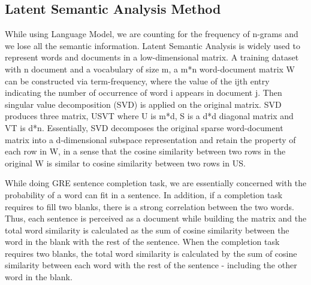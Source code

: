 \documentclass[11pt]{article}
\begin{document}
\subsection{Latent Semantic Analysis Method}
While using Language Model, we are counting for the frequency of n-grams and we lose all the semantic information. Latent Semantic Analysis is widely used to represent words and documents in a low-dimensional matrix. A training dataset with n document and a vocabulary of size m, a m*n word-document matrix W can be constructed via term-frequency, where the value of the ijth entry indicating the number of occurrence of word i appears in document j. Then singular value decomposition (SVD) is applied on the original matrix. SVD produces three matrix, USVT where U is m*d, S is a d*d diagonal matrix and VT is d*n. Essentially, SVD decomposes the original sparse word-document matrix into a d-dimensional subspace representation and retain the property of each row in W, in a sense that the cosine similarity between two rows in the original W is similar to cosine similarity between two rows in US. 

While doing GRE sentence completion task, we are essentially concerned with the probability of a word can fit in a sentence. In addition, if a completion task requires to fill two blanks, there is a strong correlation between the two words. Thus, each sentence is perceived as a document while building the matrix and the total word similarity is calculated as the sum of cosine similarity between the word in the blank with the rest of the sentence. When the completion task requires two blanks, the total word similarity is calculated by the sum of cosine similarity between each word with the rest of the sentence - including the other word in the blank.
\end{document}
